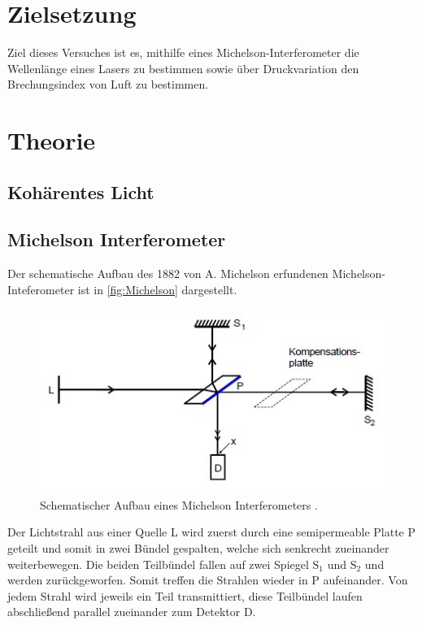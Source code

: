 \section{Zielsetzung}

Ziel dieses Versuches ist es, mithilfe eines Michelson-Interferometer die Wellenlänge
eines Lasers zu bestimmen sowie über Druckvariation den Brechungsindex von Luft zu bestimmen.

\section{Theorie}
\label{sec:Theorie}

\subsection{Kohärentes Licht}

\subsection{Michelson Interferometer}
\label{sec:Michelson Interferometer}

Der schematische Aufbau des 1882 von A. Michelson erfundenen Michelson-Inteferometer ist in
\autoref{fig:Michelson} dargestellt.

\begin{figure}[H]
    \centering
    \includegraphics[height=6cm]{content/pics/Michelson.jpg}
    \caption{Schematischer Aufbau eines Michelson Interferometers \cite{v401}.}
    \label{fig:Michelson}
\end{figure}

Der Lichtstrahl aus einer Quelle L wird zuerst durch eine semipermeable Platte P geteilt und somit in zwei Bündel gespalten,
welche sich senkrecht zueinander weiterbewegen.
Die beiden Teilbündel fallen auf zwei Spiegel $\text{S}_1$ und $\text{S}_2$ und werden zurückgeworfen.
Somit treffen die Strahlen wieder in P aufeinander.
Von jedem Strahl wird jeweils ein Teil transmittiert, diese Teilbündel laufen abschließend parallel zueinander zum
Detektor D.


